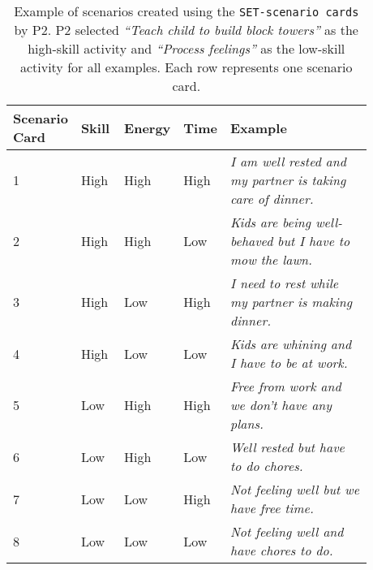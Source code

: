 \begin{table*}
    \caption{Example of scenarios created using the {\texttt{SET-scenario cards}} by P2. P2 selected {\textit{``Teach child to build block towers''}} as the high-skill activity and {\textit{``Process feelings''}} as the low-skill activity for all examples. Each row represents one scenario card.}
\label{tab:scneario-example}
        \centering
        \renewcommand{\arraystretch}{1.2}
    \small
    \begin{tabular}{p{0.12\linewidth}p{0.12\linewidth}p{0.12\linewidth}p{0.12\linewidth}p{0.4\linewidth}}
        \toprule
        \hline
        \textbf{Scenario Card} & \textbf{Skill} & \textbf{Energy} & \textbf{Time} & \textbf{Example}\\
        \midrule
         1 & High & High & High & \textit{I am well rested and my partner is taking care of dinner.} \\
\hline
         2 & High & High & Low & \textit{Kids are being well-behaved but I have to mow the lawn.} \\
\hline
         3 & High & Low & High & \textit{I need to rest while my partner is making dinner.} \\
\hline
         4 & High & Low & Low & \textit{Kids are whining and I have to be at work.} \\
\hline
         5 & Low & High & High & \textit{Free from work and we don't have any plans.} \\
\hline
         6 & Low & High & Low & \textit{Well rested but have to do chores.} \\
\hline
         7 & Low & Low & High & \textit{Not feeling well but we have free time.} \\
\hline
         8 & Low & Low & Low & \textit{Not feeling well and have chores to do.} \\
\hline
         \bottomrule
    \end{tabular}
\end{table*}

